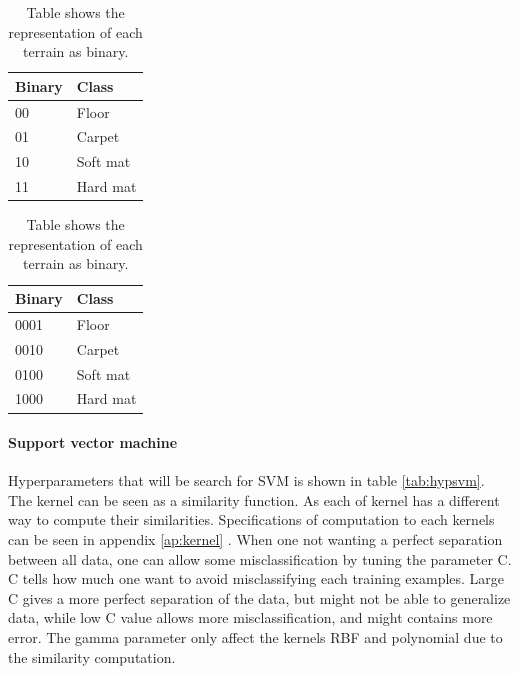 \documentclass[USenglish]{ifimaster}  %
\begin{document}
\begin{table}[h]
	\begin{subtable}[h]{0.5\textwidth}
		\centering
		\captionsetup{justification=centering}
		\begin{tabular}{@{}ll@{}}
		\toprule
		\textbf{Binary} & \textbf{Class} \\ \midrule
		00 & Floor \\
		01 & Carpet \\
		10 & Soft mat \\
		11 & Hard mat \\ \bottomrule
	\end{tabular}
		\caption{Table shows the two binary digits representation of each terrain.}
		\label{tab:twobin}
	\end{subtable}
	\hfill
	\begin{subtable}[h]{0.5\textwidth}
		\centering
		\captionsetup{justification=centering}
	\begin{tabular}{@{}ll@{}}
	\toprule
	\textbf{Binary} & \textbf{Class} \\ \midrule
	0001 & Floor \\
	0010 & Carpet \\
	0100 & Soft mat \\
	1000 & Hard mat \\ \bottomrule
\end{tabular}
		\caption{Table shows the four binary digits representation of each terrain.}
		\label{tab:fourbin}
	\end{subtable}
	\caption{Table shows the representation of each terrain as binary.}
	\label{tab:binary}
\end{table}
\FloatBarrier


\paragraph{Support vector machine}
Hyperparameters that will be search for SVM is shown in table \ref{tab:hypsvm}. The kernel can be seen as a similarity function. As each of kernel has a different way to compute their similarities. Specifications of computation to each kernels can be seen in appendix \ref{ap:kernel} . When one not wanting a perfect separation between all data, one can allow some misclassification by tuning the parameter C. C tells how much one want to avoid misclassifying each training examples. Large C gives a more perfect separation of the data, but might not be able to generalize data, while low C value allows more misclassification, and might contains more error. The gamma parameter only affect the kernels RBF and polynomial due to the similarity computation.
\end{document}
